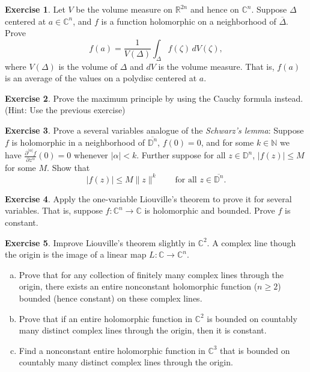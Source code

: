 \documentclass[12pt,openany]{book}
\newcommand{\sabs}[1]{\lvert {#1} \rvert}
\newcommand{\snorm}[1]{\lVert {#1} \rVert}
\newcommand{\C}{{\mathbb{C}}}
\newcommand{\R}{{\mathbb{R}}}
\newcommand{\N}{{\mathbb{N}}}
\newcommand{\D}{{\mathbb{D}}}
\newcommand{\myindex}[1]{#1\index{#1}}
\theoremstyle{plain}
\theoremstyle{remark}
\theoremstyle{definition}
\newenvironment{exbox}{%
    \def\FrameCommand{\vrule width 1pt \relax\hspace{10pt}}%
    \MakeFramed {\advance \hsize -\width \FrameRestore}%
}{%
    \endMakeFramed
}
\newenvironment{exparts}{%
    \leavevmode\begin{enumerate}[a),noitemsep,topsep=0pt,parsep=0pt,partopsep=0pt]
}{%
    \end{enumerate}
}
\theoremstyle{exercise}
\newtheorem{exercise}{Exercise}[section]
\theoremstyle{example}
\begin{document}
\begin{exbox}
\begin{exercise} \label{exercise:averageDelta}
Let $V$ be the volume measure on $\R^{2n}$ and hence on $\C^n$.
Suppose $\Delta$ centered at $a \in \C^n$, and $f$ is a function holomorphic on
a neighborhood of $\overline{\Delta}$.  Prove
\begin{equation*}
f(a) =
\frac{1}{V(\Delta)}
\int_{\Delta} f(\zeta) \, dV(\zeta) ,
\end{equation*}
where $V(\Delta)$ is the volume of $\Delta$ and $dV$ is the volume measure.
That is, $f(a)$ is an average of the values on a polydisc centered at $a$.
\end{exercise}

\begin{exercise}
Prove the maximum principle by using the Cauchy formula instead.  (Hint:
Use the previous exercise)
\end{exercise}

\begin{exercise}
Prove a several variables analogue of the \emph{\myindex{Schwarz's lemma}}:
Suppose $f$ is holomorphic in a neighborhood of $\overline{\D^n}$,
$f(0) = 0$, and for some $k \in \N$ we have
$\frac{\partial^{\sabs{\alpha}} f}{\partial z^\alpha} (0) =
0$ whenever $\sabs{\alpha} < k$.  Further suppose 
for all $z \in \D^n$,
$\sabs{f(z)} \leq M$ for some $M$.  Show that
\begin{equation*}
\sabs{f(z)} \leq M \snorm{z}^k
\qquad
\text{for all $z \in \overline{\D^n}$}.
\end{equation*}
\end{exercise}

\begin{exercise}
Apply the one-variable Liouville's theorem to prove it for several variables.
That is, suppose $f \colon \C^n \to \C$ is holomorphic and bounded.
Prove $f$ is constant.
\end{exercise}

\begin{exercise}
Improve Liouville's theorem slightly in $\C^2$.
A complex line though the origin is
the image of a linear map $L \colon \C \to \C^n$.
\begin{exparts}
\item
Prove that 
for any collection of finitely many complex lines through the origin,
there exists an entire nonconstant holomorphic function ($n \geq 2$)
bounded (hence constant) on these complex lines.
\item
Prove that if an entire holomorphic function in $\C^2$ is bounded on
countably many distinct
complex lines through the origin, then it is constant.
\item
Find a nonconstant entire holomorphic function in $\C^3$ that is
bounded on
countably many distinct
complex lines through the origin.
\pagebreak[2]
\end{exparts}
\end{exercise}


\end{exbox}
\end{document}
